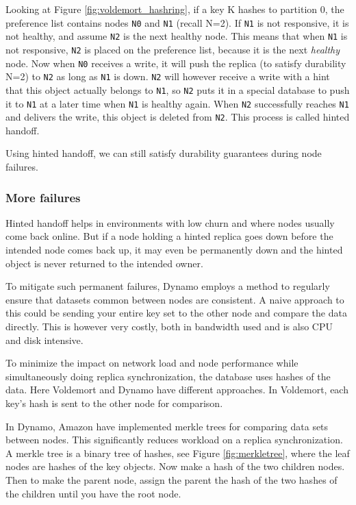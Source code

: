 Looking at Figure \ref{fig:voldemort_hashring}, if a key K hashes to partition 0, the preference list contains nodes \texttt{N0} and \texttt{N1} (recall N=2).
If \texttt{N1} is not responsive, it is not healthy, and assume \texttt{N2} is the next healthy node.
This means that when \texttt{N1} is not responsive, \texttt{N2} is placed on the preference list, because it is the next \emph{healthy} node.
Now when \texttt{N0} receives a write, it will push the replica (to satisfy durability N=2) to \texttt{N2} as long as \texttt{N1} is down.
\texttt{N2} will however receive a write with a hint that this object actually belongs to \texttt{N1}, so \texttt{N2} puts it in a special database to push it to \texttt{N1} at a later time when \texttt{N1} is healthy again. When \texttt{N2} successfully reaches \texttt{N1} and delivers the write, this object is deleted from \texttt{N2}. 
This process is called hinted handoff. 

Using hinted handoff, we can still satisfy durability guarantees during node failures.

\subsubsection{More failures}
Hinted handoff helps in environments with low churn and where nodes usually come back online. But if a node holding a hinted replica goes down before the intended node comes back up, it may even be permanently down and the hinted object is never returned to the intended owner.

To mitigate such permanent failures, Dynamo\cite{dynamo} employs a method to regularly ensure that datasets common between nodes are consistent. A naive approach to this could be sending your entire key set to the other node and compare the data directly.
This is however very costly, both in bandwidth used and is also CPU and disk intensive.

To minimize the impact on network load and node performance while simultaneously doing replica synchronization, the database uses hashes of the data. Here Voldemort and Dynamo have different approaches. In Voldemort, each key's hash is sent to the other node for comparison.

In Dynamo, Amazon have implemented merkle trees for comparing data sets between nodes. This significantly reduces workload on a replica synchronization.
A merkle tree is a binary tree of hashes, see Figure \ref{fig:merkletree}, where the leaf nodes are hashes of the key objects.
Now make a hash of the two children nodes.
Then to make the parent node, assign the parent the hash of the two hashes of the children until you have the root node. 

